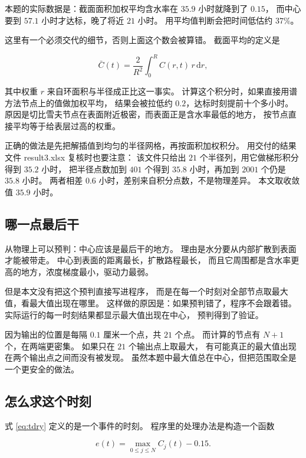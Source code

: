 本题的实际数据是：截面面积加权平均含水率在 $35.9$ 小时就降到了 $0.15$，
而中心要到 $57.1$ 小时才达标，晚了将近 $21$ 小时。
用平均值判断会把时间低估约 $37\%$。

这里有一个必须交代的细节，否则上面这个数会被算错。
截面平均的定义是

\begin{equation}
\bar C(t)=\frac{2}{R^2}\int_0^{R}C(r,t)\,r\,\mathrm{d}r ,
\end{equation}

其中权重 $r$ 来自环面积与半径成正比这一事实。
计算这个积分时，如果直接用谱方法节点上的值做加权平均，
结果会被拉低约 $0.2$，达标时刻提前十个多小时。
原因是切比雪夫节点在表面附近极密，而表面正是含水率最低的地方，
按节点直接平均等于给表层过高的权重。

正确的做法是先把解插值到均匀的半径网格，再按面积加权积分。
用交付的结果文件 result3.xlsx 复核时也要注意：
该文件只给出 $21$ 个半径列，用它做梯形积分得到 $35.2$ 小时，
把半径点数加到 $401$ 个得到 $35.8$ 小时，再加到 $2001$ 个仍是 $35.8$ 小时。
两者相差 $0.6$ 小时，差别来自积分点数，不是物理差异。
本文取收敛值 $35.9$ 小时。

\subsection{哪一点最后干}

从物理上可以预判：中心应该是最后干的地方。
理由是水分要从内部扩散到表面才能被带走。
中心到表面的距离最长，扩散路程最长，
而且它周围都是含水率更高的地方，浓度梯度最小，驱动力最弱。

但是本文没有把这个预判直接写进程序，
而是在每一个时刻对全部节点取最大值，看最大值出现在哪里。
这样做的原因是：如果预判错了，程序不会跟着错。
实际运行的每一时刻结果都显示最大值出现在中心，
预判得到了验证。

因为输出的位置是每隔 $0.1$ 厘米一个点，共 $21$ 个点。
而计算的节点有 $N+1$ 个，在两端更密集。
如果只在 $21$ 个输出点上取最大，
有可能真正的最大值出现在两个输出点之间而没有被发现。
虽然本题中最大值总在中心，但把范围取全是一个更安全的做法。

\subsection{怎么求这个时刻}

式 \eqref{eq:tdry} 定义的是一个事件的时刻。
程序里的处理办法是构造一个函数

\begin{equation}
e(t) = \max_{0\le j\le N}C_j(t) - 0.15 .
\end{equation}

